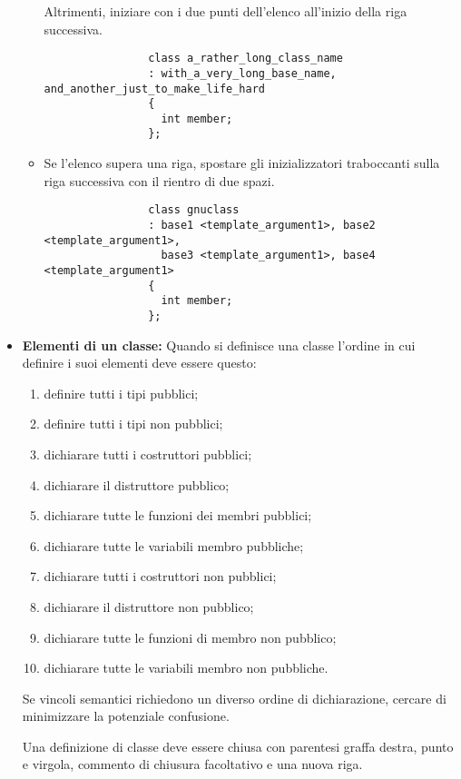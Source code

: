 \documentclass[../NomeDocumento.tex]{subfiles}
\begin{document}
\begin{itemize}
\begin{itemize}
				Altrimenti, iniziare con i due punti dell'elenco all'inizio della riga successiva.
				
				\begin{verbatim}
				class a_rather_long_class_name
				: with_a_very_long_base_name, and_another_just_to_make_life_hard
				{
				  int member;
				};
				\end{verbatim}
					
			\item Se l'elenco supera una riga, spostare gli inizializzatori traboccanti sulla riga successiva con il rientro di due spazi.
				
				\begin{verbatim}
				class gnuclass
				: base1 <template_argument1>, base2 <template_argument1>,
				  base3 <template_argument1>, base4 <template_argument1>
				{
				  int member;
				};
				\end{verbatim}
		\end{itemize}
	
		\item \textbf{Elementi di un classe:} Quando si definisce una classe l'ordine in cui definire i suoi elementi deve essere questo:
					
		\begin{enumerate}
			\item definire tutti i tipi pubblici;
			\item definire tutti i tipi non pubblici;
			\item dichiarare tutti i costruttori pubblici;
			\item dichiarare il distruttore pubblico;
			\item dichiarare tutte le funzioni dei membri pubblici;
			\item dichiarare tutte le variabili membro pubbliche;
			\item dichiarare tutti i costruttori non pubblici;
			\item dichiarare il distruttore non pubblico;
			\item dichiarare tutte le funzioni di membro non pubblico;
			\item dichiarare tutte le variabili membro non pubbliche.				
		\end{enumerate}
			
		Se vincoli semantici richiedono un diverso ordine di dichiarazione, cercare di minimizzare la potenziale confusione.
			
		Una definizione di classe deve essere chiusa con parentesi graffa destra, punto e virgola, commento di chiusura facoltativo e una nuova riga.
			

\end{itemize}
\end{document}
